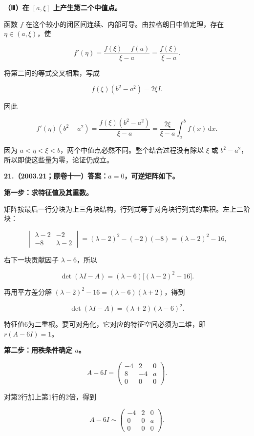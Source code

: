 \documentclass[UTF8,11pt,fontset=windows]{ctexart}
\begin{document}
\textbf{（Ⅲ）在 $[a,\xi]$ 上产生第二个中值点。}

函数 $f$ 在这个较小的闭区间连续、内部可导。由拉格朗日中值定理，存在 $\eta\in(a,\xi)$，使

$$
f'(\eta)=\frac{f(\xi)-f(a)}{\xi-a}
=\frac{f(\xi)}{\xi-a}.
$$

将第二问的等式交叉相乘，写成

$$
f(\xi)(b^2-a^2)=2\xi I.
$$

因此

$$
\boxed{f'(\eta)(b^2-a^2)
=\frac{f(\xi)(b^2-a^2)}{\xi-a}
=\frac{2\xi}{\xi-a}\int_a^b f(x)\,\mathrm dx.}
$$

因为 $a<\eta<\xi<b$，两个中值点必然不同。整个结合过程没有除以 $\xi$ 或 $b^2-a^2$，所以即使这些量为零，论证仍成立。

\clearpage

\textbf{21.（2003.21；原卷十一）答案：$a=0$，可逆矩阵如下。}

\textbf{第一步：求特征值及其重数。}

矩阵按最后一行分块为上三角块结构，行列式等于对角块行列式的乘积。左上二阶块：

$$
\begin{vmatrix}\lambda-2&-2\\-8&\lambda-2\end{vmatrix}
=(\lambda-2)^2-(-2)(-8)
=(\lambda-2)^2-16,
$$

右下一块贡献因子 $\lambda-6$，所以

$$
\det(\lambda I-A)
=(\lambda-6)\bigl[(\lambda-2)^2-16\bigr].
$$

再用平方差分解 $(\lambda-2)^2-16=(\lambda-6)(\lambda+2)$，得到

$$
\det(\lambda I-A)=(\lambda+2)(\lambda-6)^2.
$$

特征值6为二重根。要可对角化，它对应的特征空间必须为二维，即 $r(A-6I)=1$。

\textbf{第二步：用秩条件确定 $a$。}

$$
A-6I=\begin{pmatrix}-4&2&0\\8&-4&a\\0&0&0\end{pmatrix}.
$$

对第2行加上第1行的2倍，得到

$$
A-6I\sim\begin{pmatrix}-4&2&0\\0&0&a\\0&0&0\end{pmatrix}.
$$
\end{document}
